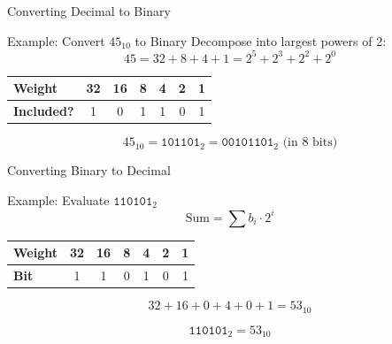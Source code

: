\documentclass[aspectratio=169,11pt]{beamer}
\newcommand{\bits}[1]{\texttt{#1}}
\begin{document}

\begin{frame}{Converting Decimal to Binary}

\begin{block}{Example: Convert $45_{10}$ to Binary}
Decompose into largest powers of 2:
$$45 = 32 + 8 + 4 + 1 = 2^5 + 2^3 + 2^2 + 2^0$$
\end{block}

\begin{center}
\begin{tabular}{lcccccc}
\toprule
\textbf{Weight} & 32 & 16 & 8 & 4 & 2 & 1 \\
\midrule
\textbf{Included?} & 1 & 0 & 1 & 1 & 0 & 1 \\
\bottomrule
\end{tabular}
\end{center}

$$45_{10} = \bits{101101}_2 = \bits{00101101}_2 \text{ (in 8 bits)}$$

\end{frame}


\begin{frame}{Converting Binary to Decimal}

\begin{block}{Example: Evaluate $\bits{110101}_2$}
$$\text{Sum} = \sum b_i \cdot 2^i$$
\end{block}

\begin{center}
\begin{tabular}{lcccccc}
\toprule
\textbf{Weight} & 32 & 16 & 8 & 4 & 2 & 1 \\
\midrule
\textbf{Bit} & 1 & 1 & 0 & 1 & 0 & 1 \\
\bottomrule
\end{tabular}
\end{center}

$$32 + 16 + 0 + 4 + 0 + 1 = 53_{10}$$

$$\bits{110101}_2 = 53_{10}$$

\end{frame}

\end{document}
